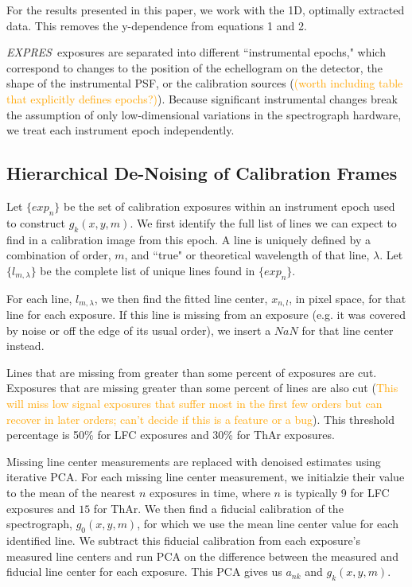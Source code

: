 \documentclass[12pt, letterpaper]{article}
\newcommand{\lz}[1]{\textcolor{orange}{#1}}
\newcommand{\project}[1]{\textsl{#1}}
\newcommand{\acronym}[1]{{\small{#1}}}
\newcommand{\expres}{\project{\acronym{EXPRES}}}
\begin{document}
For the results presented in this paper, we work with the 1D, optimally extracted data.  This removes the y-dependence from equations 1 and 2.

\expres\ exposures are separated into different ``instrumental epochs," which correspond to changes to the position of the echellogram on the detector, the shape of the instrumental PSF, or the calibration sources (\lz{(worth including table that explicitly defines epochs?)}).  Because significant instrumental changes break the assumption of only low-dimensional variations in the spectrograph hardware, we treat each instrument epoch independently.

\subsection{Hierarchical De-Noising of Calibration Frames} \label{sec:denoising}
Let $\{exp_n\}$ be the set of calibration exposures within an instrument epoch used to construct $g_k(x,y,m)$.  We first identify the full list of lines we can expect to find in a calibration image from this epoch.  A line is uniquely defined by a combination of order, $m$, and ``true" or theoretical wavelength of that line, $\lambda$.  Let $\{l_{m,\lambda}\}$ be the complete list of unique lines found in $\{exp_n\}$.

For each line, $l_{m,\lambda}$, we then find the fitted line center, $x_{n,l}$, in pixel space, for that line for each exposure.  If this line is missing from an exposure (e.g. it was covered by noise or off the edge of its usual order), we insert a $NaN$ for that line center instead.

Lines that are missing from greater than some percent of exposures are cut.  Exposures that are missing greater than some percent of lines are also cut (\lz{This will miss low signal exposures that suffer most in the first few orders but can recover in later orders; can't decide if this is a feature or a bug}).  This threshold percentage is 50\% for LFC exposures and 30\% for ThAr exposures.

Missing line center measurements are replaced with denoised estimates using iterative PCA.  For each missing line center measurement, we initialzie their value to the mean of the nearest $n$ exposures in time, where $n$ is typically 9 for LFC exposures and $15$ for ThAr.  We then find a fiducial calibration of the spectrograph,  $g_0(x,y,m)$, for which we use the mean line center value for each identified line.  We subtract this fiducial calibration from each exposure's measured line centers and run PCA on the difference between the measured and fiducial line center for each exposure.  This PCA gives us $a_{nk}$ and $g_k(x,y,m)$.
\end{document}

